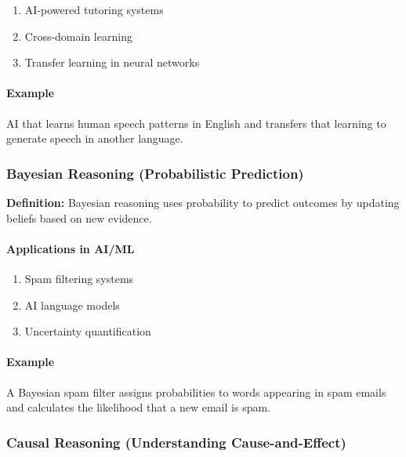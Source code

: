 \begin{enumerate}
\item AI-powered tutoring systems
\item Cross-domain learning
\item Transfer learning in neural networks
\end{enumerate}

\paragraph{Example}
\label{para:analogical-example}

AI that learns human speech patterns in English and transfers that learning to generate speech in another language.

\subsubsection{Bayesian Reasoning (Probabilistic Prediction)}
\label{subsubsec:bayesian-reasoning}

\textbf{Definition:} Bayesian reasoning uses probability to predict outcomes by updating beliefs based on new evidence.

\paragraph{Applications in AI/ML}
\label{para:bayesian-applications}

\begin{enumerate}
\item Spam filtering systems
\item AI language models
\item Uncertainty quantification
\end{enumerate}

\paragraph{Example}
\label{para:bayesian-example}

A Bayesian spam filter assigns probabilities to words appearing in spam emails and calculates the likelihood that a new email is spam.

\subsubsection{Causal Reasoning (Understanding Cause-and-Effect)}
\label{subsubsec:causal-reasoning}

